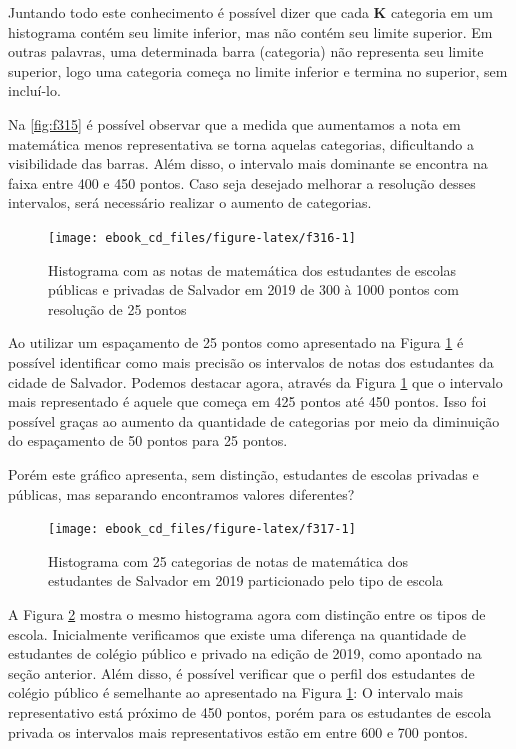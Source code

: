 \documentclass[
  portuguese,
  oneside]{book}
\begin{document}
Juntando todo este conhecimento é possível dizer que cada \textbf{K} categoria em um histograma contém seu limite inferior, mas não contém seu limite superior. Em outras palavras, uma determinada barra (categoria) não representa seu limite superior, logo uma categoria começa no limite inferior e termina no superior, sem incluí-lo.

Na \ref{fig:f315} é possível observar que a medida que aumentamos a nota em matemática menos representativa se torna aquelas categorias, dificultando a visibilidade das barras. Além disso, o intervalo mais dominante se encontra na faixa entre 400 e 450 pontos. Caso seja desejado melhorar a resolução desses intervalos, será necessário realizar o aumento de categorias.

\begin{figure}

{\centering \texttt{[image: ebook\_cd\_files/figure-latex/f316-1]} 

}

\caption{Histograma com as notas de matemática dos estudantes de escolas públicas e privadas de Salvador em 2019 de 300 à 1000 pontos com resolução de 25 pontos}\label{fig:f316}
\end{figure}

Ao utilizar um espaçamento de 25 pontos como apresentado na Figura \ref{fig:f316} é possível identificar como mais precisão os intervalos de notas dos estudantes da cidade de Salvador. Podemos destacar agora, através da Figura \ref{fig:f316} que o intervalo mais representado é aquele que começa em 425 pontos até 450 pontos. Isso foi possível graças ao aumento da quantidade de categorias por meio da diminuição do espaçamento de 50 pontos para 25 pontos.

Porém este gráfico apresenta, sem distinção, estudantes de escolas privadas e públicas, mas separando encontramos valores diferentes?

\begin{figure}

{\centering \texttt{[image: ebook\_cd\_files/figure-latex/f317-1]} 

}

\caption{Histograma com 25 categorias de notas de matemática dos estudantes de Salvador em 2019 particionado pelo tipo de escola}\label{fig:f317}
\end{figure}

A Figura \ref{fig:f317} mostra o mesmo histograma agora com distinção entre os tipos de escola. Inicialmente verificamos que existe uma diferença na quantidade de estudantes de colégio público e privado na edição de 2019, como apontado na seção anterior. Além disso, é possível verificar que o perfil dos estudantes de colégio público é semelhante ao apresentado na Figura \ref{fig:f316}: O intervalo mais representativo está próximo de 450 pontos, porém para os estudantes de escola privada os intervalos mais representativos estão em entre 600 e 700 pontos.
\end{document}

